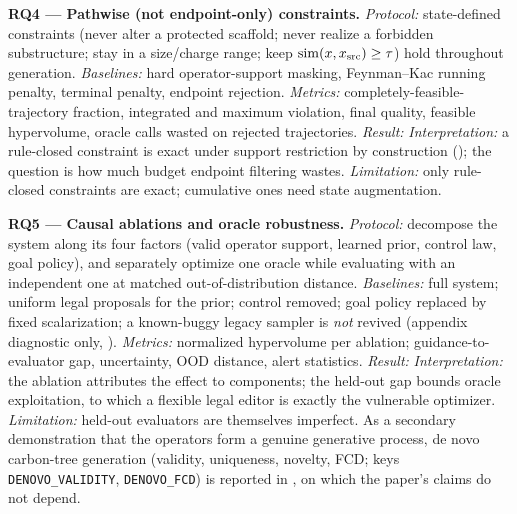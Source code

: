 \textbf{RQ4 --- Pathwise (not endpoint-only) constraints.} \textit{Protocol:} state-defined constraints
(never alter a protected scaffold; never realize a forbidden substructure; stay in a size/charge range;
keep $\mathrm{sim}(x,x_{\mathrm{src}})\ge\tau$) hold throughout generation. \textit{Baselines:} hard operator-support
masking, Feynman--Kac running penalty, terminal penalty, endpoint rejection. \textit{Metrics:}
completely-feasible-trajectory fraction, integrated and maximum violation, final quality, feasible
hypervolume, oracle calls wasted on rejected trajectories. \textit{Result:}
 \textit{Interpretation:} a rule-closed constraint is exact under
support restriction by construction (); the question is how much budget endpoint
filtering wastes. \textit{Limitation:} only rule-closed constraints are exact; cumulative ones need state
augmentation.

\textbf{RQ5 --- Causal ablations and oracle robustness.} \textit{Protocol:} decompose the system along
its four factors (valid operator support, learned prior, control law, goal policy), and separately
optimize one oracle while evaluating with an independent one at matched out-of-distribution distance.
\textit{Baselines:} full system; uniform legal proposals for the prior; control removed; goal policy
replaced by fixed scalarization; a known-buggy legacy sampler is \emph{not} revived (appendix diagnostic
only, ). \textit{Metrics:} normalized hypervolume per ablation; guidance-to-evaluator gap,
uncertainty, OOD distance, alert statistics. \textit{Result:} 
 \textit{Interpretation:} the ablation attributes the effect to
components; the held-out gap bounds oracle exploitation, to which a flexible legal editor is exactly the
vulnerable optimizer. \textit{Limitation:} held-out evaluators are themselves imperfect. As a secondary
demonstration that the operators form a genuine generative process, de novo carbon-tree generation
(validity, uniqueness, novelty, FCD; keys \texttt{DENOVO\_VALIDITY}, \texttt{DENOVO\_FCD}) is reported in
, on which the paper's claims do not depend.